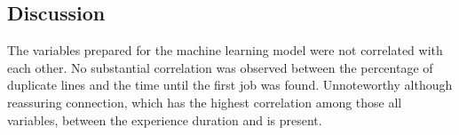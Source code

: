 \subsection{Discussion}
\label{sec:discussion}

The variables prepared for the machine learning model were not correlated with each other. No substantial correlation was observed between the percentage of duplicate lines and the time until the first job was found. Unnoteworthy although reassuring connection, which has the highest correlation among those all variables, between the experience duration and  is present. 
